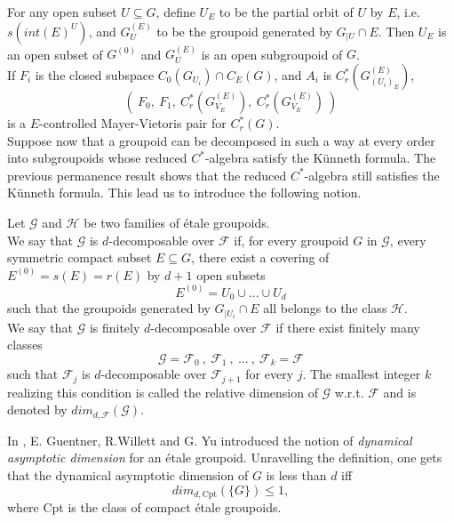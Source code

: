 For any open subset $U\subseteq G$, define $U_E$ to be the partial orbit of $U$ by $E$, i.e. $s(int(E)^U)$, and $G^{(E)}_U$ to be the groupoid generated by $G_{|U}\cap E$. Then $U_E$ is an open subset of $G^{(0)}$ and $G^{(E)}_U$ is an open subgroupoid of $G$.\\
 
If $F_i$ is the closed subspace $C_0(G_{U_i})\cap C_E(G)$, and $A_i$ is $C_r^*(G_{(U_i)_E}^{(E)})$, 
\[\left( \ F_0 , \ F_1 , \ C_r^*(G_{V_E}^{(E)}) , \ C_r^*(G_{V_E}^{(E)}) \  \right)\]
is a $E$-controlled Mayer-Vietoris pair for $C_r^*(G)$. \\
Suppose now that a groupoid can be decomposed in such a way at every order into subgroupoids whose reduced $C^*$-algebra satisfy the Künneth formula. The previous permanence result shows that the reduced $C^*$-algebra still satisfies the Künneth formula. This lead us to introduce the following notion.

\begin{definition}
Let $\mathcal G$ and $\mathcal H$ be two families of \'etale groupoids. \\

We say that $\mathcal G$ is $d$-decomposable over $\mathcal F$ if, for every groupoid $G$ in $\mathcal G$, every symmetric compact subset $E\subseteq G$, there exist a covering of $E^{(0)} = s(E)=r(E)$ by $d+1$ open subsets 
\[E^{(0)} = U_0 \cup ... \cup U_d \] such that the groupoids generated by $G_{|U_i} \cap E$ all belongs to the class $\mathcal H$.\\

We say that $\mathcal G$ is finitely $d$-decomposable over $\mathcal F$ if there exist finitely many classes 
\[\mathcal G= \mathcal F_0 \ , \ \mathcal F_1 \ , \ ... \ , \ \mathcal F_k = \mathcal F \] 
such that $\mathcal F_j$ is $d$-decomposable over $\mathcal F_{j+1}$ for every $j$. The smallest integer $k$ realizing this condition is called the relative dimension of $\mathcal G$ w.r.t. $\mathcal F$ and is denoted by $dim_{d,\mathcal F}(\mathcal G)$.  
\end{definition}

In \cite{GWY}, E. Guentner, R.Willett and G. Yu introduced the notion of \textit{dynamical asymptotic dimension} for an \'etale groupoid. Unravelling the definition, one gets that the dynamical asymptotic dimension of $G$ is less than $d$ iff \[dim_{d,\text{Cpt}} (\{G\}) \leq 1,\]
where Cpt is the class of compact \'etale groupoids.\\

